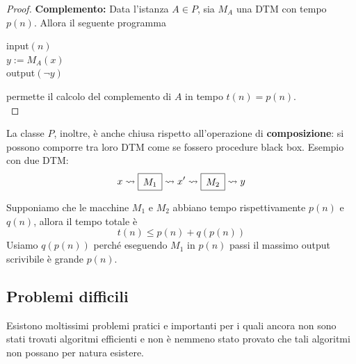 \begin{proof}
	\textbf{Complemento:} Data l'istanza $A \in P$, sia $M_A$ una DTM con tempo $p(n)$. Allora il seguente programma
	\begin{center}
		\begin{minipage}{.33\textwidth}
			\begin{tcolorbox}[
				colback=white,
				sharp corners,
				boxrule=.3mm,
				left=20pt,
				top=0pt,
				bottom=0pt,
				colbacktitle=white,
				coltitle=black
				]
				\begin{algorithm}[H]
					\SetAlgoNoEnd
					input$(n)$\\
					$y := M_A (x)$\\
					output$(\neg y)$
				\end{algorithm}
			\end{tcolorbox}
		\end{minipage}
	\end{center}
	permette il calcolo del complemento di $A$ in tempo $t(n) = p(n)$. \\
\end{proof}

La classe $P$, inoltre, è anche chiusa rispetto all'operazione di \textbf{composizione}: si possono comporre tra loro DTM come se fossero procedure black box. Esempio con due DTM:
$$ 
\renewcommand{\arraystretch}{1.4}
x \rightsquigarrow \begin{array}{|c|}
	\hline
	M_1 \\
	\hline
\end{array} \rightsquigarrow x' \rightsquigarrow \begin{array}{|c|}
\hline
M_2 \\
\hline
\end{array} \rightsquigarrow y $$

Supponiamo che le macchine $M_1$ e $M_2$ abbiano tempo rispettivamente $p(n)$ e $q(n)$, allora il tempo totale è 
$$ t(n) \leq p(n) + q(p(n)) $$
Usiamo $q(p(n))$ perché eseguendo $M_1$ in $p(n)$ passi il massimo output scrivibile è grande $p(n)$.

\subsection{Problemi difficili}

Esistono moltissimi problemi pratici e importanti per i quali ancora non sono stati trovati algoritmi efficienti e non è nemmeno stato provato che tali algoritmi non possano per natura esistere. 


